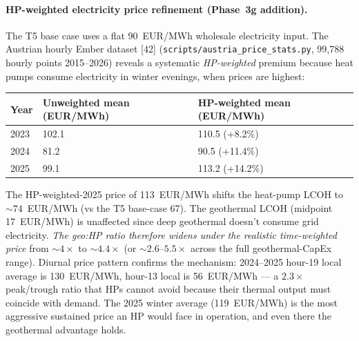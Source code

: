 \documentclass{article}
\begin{document}
\paragraph{HP-weighted electricity price refinement (Phase~3g addition).}
The T5 base case uses a flat $90$~EUR/MWh wholesale electricity input.
The Austrian hourly Ember dataset [42] (\texttt{scripts/austria\_price\_stats.py},
99{,}788 hourly points 2015--2026) reveals a systematic
\emph{HP-weighted} premium because heat pumps consume electricity in
winter evenings, when prices are highest:

\begin{center}
\begin{tabular}{lll}
\hline
\textbf{Year} & \textbf{Unweighted mean (EUR/MWh)} & \textbf{HP-weighted mean (EUR/MWh)} \\
\hline
2023 & 102.1 & 110.5 (+8.2\%) \\
2024 &  81.2 &  90.5 (+11.4\%) \\
2025 &  99.1 & 113.2 (+14.2\%) \\
\hline
\end{tabular}
\end{center}

The HP-weighted-2025 price of 113~EUR/MWh shifts the heat-pump LCOH
to $\sim 74$~EUR/MWh (vs the T5 base-case 67). The geothermal LCOH
(midpoint 17~EUR/MWh) is unaffected since deep geothermal doesn't
consume grid electricity. \emph{The geo:HP ratio therefore widens
under the realistic time-weighted price} from $\sim 4\times$ to
$\sim 4.4\times$ (or $\sim 2.6$--$5.5\times$ across the full
geothermal-CapEx range). Diurnal price pattern confirms the
mechanism: 2024--2025 hour-19 local average is 130~EUR/MWh,
hour-13 local is 56~EUR/MWh --- a $2.3\times$ peak/trough ratio that
HPs cannot avoid because their thermal output must coincide with
demand. The 2025 winter average (119~EUR/MWh) is the most aggressive
sustained price an HP would face in operation, and even there the
geothermal advantage holds.
\end{document}
